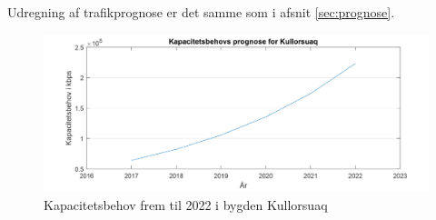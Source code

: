 Udregning af trafikprognose er det samme som i afsnit \ref{sec:prognose}.
\begin{figure}[!h]
	\centering
	\includegraphics[width=1\textwidth]{figure/kapBehovKullorsuaq.pdf}
	\caption{Kapacitetsbehov frem til 2022 i bygden Kullorsuaq}
	\label{fig:kapBehovKullorsuaq}
\end{figure}